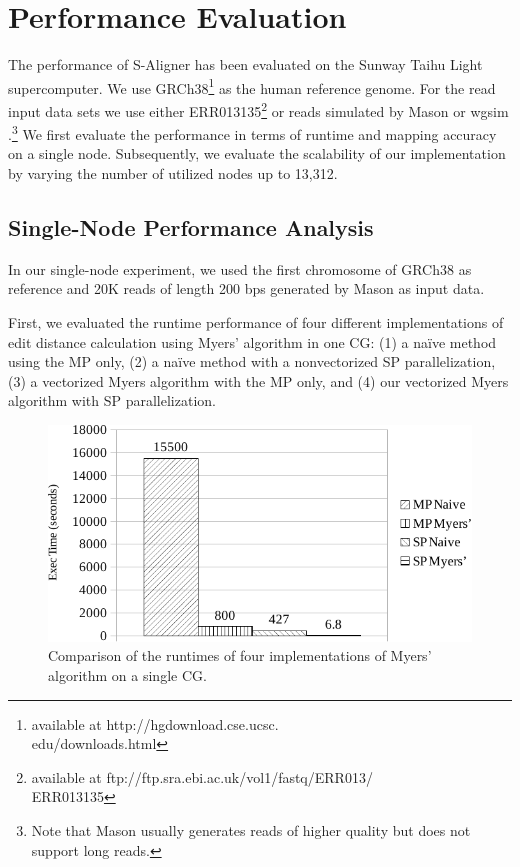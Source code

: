 \section{Performance Evaluation}
\label{Evaluation}

The performance of S-Aligner has been evaluated on the Sunway Taihu
Light supercomputer. We use GRCh38\footnote{available at
  http://hgdownload.cse.ucsc.\\edu/downloads.html} as the human
reference genome.  For the read input data sets we use either
ERR013135\footnote{available at
  ftp://ftp.sra.ebi.ac.uk/vol1/fastq/ERR013/\\ERR013135} or reads
simulated by Mason \cite{mason} or wgsim \cite{wgsim}.\footnote{Note
  that Mason usually generates reads of higher quality but does not
  support long reads.}  We first evaluate the performance in terms of
runtime and mapping accuracy on a single node. Subsequently, we
evaluate the scalability of our implementation by varying the number
of utilized nodes up to 13,312.

\subsection{Single-Node Performance Analysis}

In our single-node experiment, we used the first chromosome of GRCh38 as
reference and 20K reads of length 200 bps generated by Mason as input
data.

First, we evaluated the runtime performance of four different
implementations of edit distance calculation using Myers' algorithm in
one CG: (1) a na\"ive method using the MP only, (2) a na\"ive method
with a nonvectorized SP parallelization, (3) a vectorized Myers
algorithm with the MP only, and (4) our vectorized Myers algorithm
with SP parallelization.

\begin{figure}[!htb]
  \begin{center}
    \includegraphics[width=1\linewidth]{figures/VarVerCha}
    \caption{Comparison of the runtimes of four implementations of
      Myers' algorithm on a single CG.}
    \label{VarVerCha}
  \end{center}
\end{figure}

